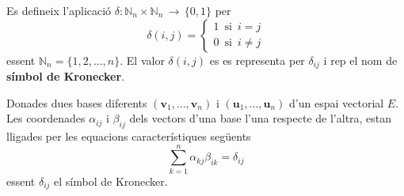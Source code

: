 \begin{definicio}
Es defineix l’aplicació $\delta : \mathbb{N}_{n}\times \mathbb{N}%
_{n}\,\rightarrow\, \{0,1\}$ per 
\begin{equation*}
\delta (i,j)=\left\{ 
\begin{array}{l}
1\,\text{ si }\,i=j \\ 
0\,\text{ si }\,i\neq j%
\end{array}
\right.
\end{equation*}%
essent $\mathbb{N}_{n}=\{ 1,2,...,n\} $. El valor $\delta (i,j)$ es
es representa per $\delta _{ij}$ i rep el nom de \textbf{símbol de
Kronecker}.
\end{definicio}

\begin{teorema}
Donades dues bases diferents $(\mathbf{v}_{1},...,\mathbf{v}_{n})$ i $(\mathbf{u%
}_{1},...,\mathbf{u}_{n})$ d’un espai vectorial $E$. Les
coordenades $\alpha _{ij}$ i $\beta _{ij}$ dels vectors d’una base
l'una respecte de l'altra, estan lligades per les equacions característiques següents 
\begin{equation*}
\sum_{k=1}^{n}\alpha _{kj}\beta _{ik}=\delta _{ij}
\end{equation*}%
essent $\delta _{ij}$ el símbol de Kronecker.

\end{teorema}
